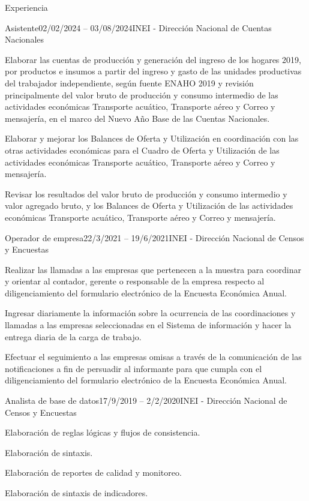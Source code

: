 \documentclass[
11pt, %
]{resume} %
\begin{document}
\begin{rSection}{Experiencia}
\begin{rSubsection}{Asistente}{02/02/2024 – 03/08/2024}{INEI - Dirección Nacional de Cuentas Nacionales}{}
			\item Elaborar las cuentas de producción y generación del ingreso de los hogares 2019, por productos e insumos a partir del ingreso y gasto de las unidades productivas del trabajador independiente, según fuente ENAHO 2019 y revisión principalmente del valor bruto de producción y consumo intermedio de las actividades económicas Transporte acuático, Transporte aéreo y Correo y mensajería, en el marco del Nuevo Año Base de las Cuentas Nacionales.
			\item Elaborar y mejorar los Balances de Oferta y Utilización en coordinación con las otras actividades económicas para el Cuadro de Oferta y Utilización de las actividades económicas Transporte acuático, Transporte aéreo y Correo y mensajería. 
			\item Revisar los resultados del valor bruto de producción y consumo intermedio y valor agregado bruto, y los Balances de Oferta y Utilización de las actividades económicas Transporte acuático, Transporte aéreo y Correo y mensajería. 
			
		\end{rSubsection}
		
		
		\begin{rSubsection}{Operador de empresa}{22/3/2021 – 19/6/2021}{INEI - Dirección Nacional de Censos y Encuestas}{}
			\item Realizar las llamadas a las empresas que pertenecen a la muestra para coordinar y orientar al contador, gerente o responsable de la empresa respecto al diligenciamiento del formulario electrónico de la Encuesta Económica Anual.
			\item Ingresar diariamente la información sobre la ocurrencia de las coordinaciones y llamadas a las empresas seleccionadas en el Sistema de información y hacer la entrega diaria de la carga de trabajo.
			\item Efectuar el seguimiento a las empresas omisas a través de la comunicación de las notificaciones a fin de persuadir al informante para que cumpla con el diligenciamiento del formulario electrónico de la Encuesta Económica Anual.
		\end{rSubsection}
		
		
			
		\begin{rSubsection}{Analista de base de datos}{17/9/2019 – 2/2/2020}{INEI - Dirección Nacional de Censos y Encuestas}{}
			\item Elaboración de reglas lógicas y flujos de consistencia.
			\item Elaboración de sintaxis.
			\item Elaboración de reportes de calidad y monitoreo.
			\item Elaboración de sintaxis de indicadores.
		\end{rSubsection}
			

\end{rSection}
\end{document}
